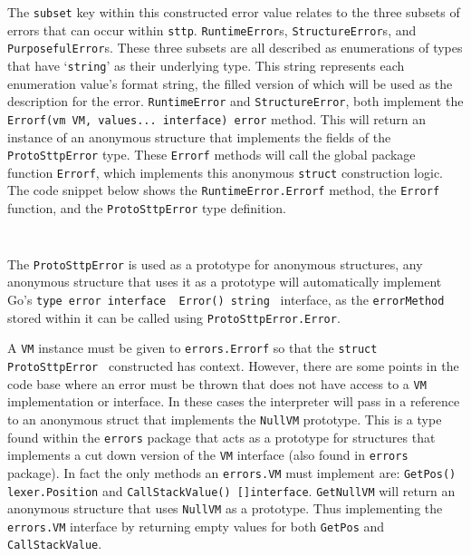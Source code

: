 The \verb|subset| key within this constructed error value relates to the three subsets of errors that can occur within \verb|sttp|. \verb|RuntimeError|s, \verb|StructureError|s, and \verb|PurposefulError|s. These three subsets are all described as enumerations of types that have `\texttt{string}' as their underlying type. This string represents each enumeration value's format string, the filled version of which will be used as the description for the error. \verb|RuntimeError| and \verb|StructureError|, both implement the \texttt{Errorf(vm VM, values... interface{}) error} method. This will return an instance of an anonymous structure that implements the fields of the \verb|ProtoSttpError| type. These \verb|Errorf| methods will call the global package function \verb|Errorf|, which implements this anonymous \texttt{struct} construction logic. The code snippet below shows the \verb|RuntimeError.Errorf| method, the \verb|Errorf| function, and the \verb|ProtoSttpError| type definition.

\inputminted[firstline=73, lastline=105, autogobble, breaklines, tabsize=4]{go}{../../src/errors/errors.go}

\inputminted[firstline=8, lastline=23, autogobble, breaklines, tabsize=4]{go}{../../src/errors/errors.go}

The \verb|ProtoSttpError| is used as a prototype for anonymous structures, any anonymous structure that uses it as a prototype will automatically implement Go's \texttt{type error interface { Error() string }} interface, as the \verb|errorMethod| stored within it can be called using \verb|ProtoSttpError.Error|.

A \verb|VM| instance must be given to \verb|errors.Errorf| so that the \texttt{struct { ProtoSttpError }} constructed has context. However, there are some points in the code base where an error must be thrown that does not have access to a \verb|VM| implementation or interface. In these cases the interpreter will pass in a reference to an anonymous struct that implements the \verb|NullVM| prototype. This is a type found within the \verb|errors| package that acts as a prototype for structures that implements a cut down version of the \verb|VM| interface (also found in \verb|errors| package). In fact the only methods an \verb|errors.VM| must implement are: \texttt{GetPos() lexer.Position} and \texttt{CallStackValue() []interface{}}. \verb|GetNullVM| will return an anonymous structure that uses \verb|NullVM| as a prototype. Thus implementing the \verb|errors.VM| interface by returning empty values for both \verb|GetPos| and \verb|CallStackValue|.

